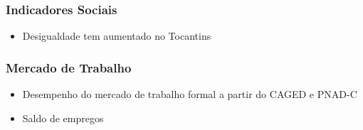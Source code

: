 \documentclass[12pt,aspectratio=169]{beamer}
\begin{document}
\begin{frame}
	\frametitle{Indicadores Sociais}
	\begin{itemize}
		\item Desigualdade tem aumentado no Tocantins
	\end{itemize}
	
	\begin{figure}%
		\centering
	\end{figure}	
\end{frame}

\begin{frame}
	\frametitle{Mercado de Trabalho}
	
	\begin{itemize}
		\item Desempenho do mercado de trabalho formal a partir do CAGED e PNAD-C
		\item Saldo de empregos
	\end{itemize}

\begin{figure}%
	\centering
	\qquad
	
\end{figure}
\end{frame}
\end{document}
